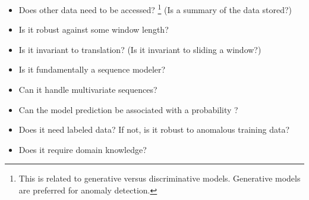 \begin{itemize}

\item Does other data need to be accessed?%
\footnote{This is related to generative versus discriminative models. Generative models are preferred for anomaly detection.}
(Is a summary of the data stored?)

\item Is it robust against some window length?

\item Is it invariant to translation? (Is it invariant to sliding a window?)

\item Is it fundamentally a sequence modeler?

\item Can it handle multivariate sequences?

\item Can the model prediction be associated with a probability \cite{Graves2013b}?

\item Does it need labeled data? If not, is it robust to anomalous training data?

\item Does it require domain knowledge?

\end{itemize}


